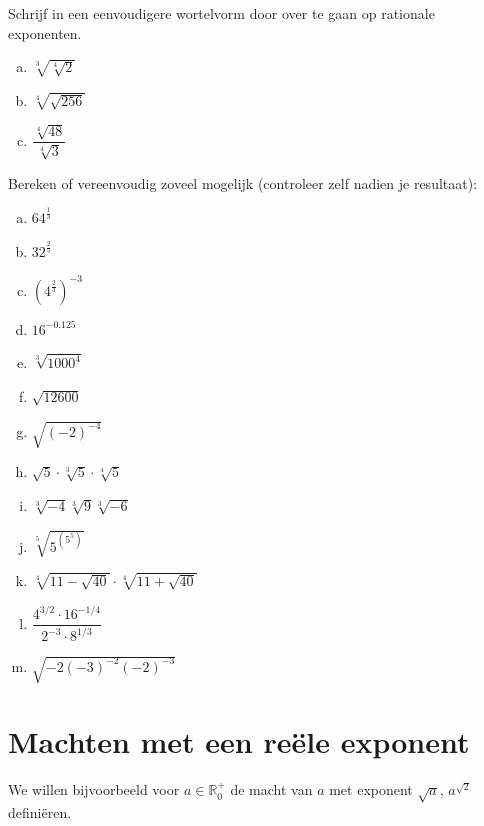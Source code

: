 \documentclass[12pt,twoside,a4paper]{article}
\begin{document}
\begin{oefening}
Schrijf in een eenvoudigere wortelvorm door over te gaan op rationale exponenten.
\begin{multicols}{2}
\begin{enumerate}[(a)]
  \itemsep1em
  \item $\sqrt[3]{\sqrt[4]{2}}$
  \item $\sqrt[4]{\sqrt{256}}$
  \item $\dfrac{\sqrt[4]{48}}{\sqrt[4]{3}}$
\end{enumerate}
\end{multicols}
\end{oefening}

\begin{oefening}
Bereken of vereenvoudig zoveel mogelijk (controleer zelf nadien je resultaat):
\begin{multicols}{3}
\begin{enumerate}[(a)]
  \itemsep1em
  \item $64^{\frac{1}{3}}$
  \item $32^{\frac{2}{5}}$
  \item $\left(4^{\frac{2}{3}}\right)^{-3}$
  \item $16^{-0.125}$
  \item $\sqrt[3]{1000^4}$
  \item $\sqrt{12600}$
  \item $\sqrt{\left(-2\right)^{-4}}$
  \item $\sqrt{5}\cdot\sqrt[3]{5}\cdot\sqrt[4]{5}$
  \item $\sqrt[3]{-4}\sqrt[3]{9}\sqrt[3]{-6}$
  \item $\sqrt[5]{5^{(5^5)}}$
  \item $\sqrt[4]{11-\sqrt{40}}\cdot\sqrt[4]{11+\sqrt{40}}$
  \item $\dfrac{4^{3/2}\cdot 16^{-1/4}}{2^{-3}\cdot 8^{1/3}}$
  \item $\sqrt{-2(-3)^{-2}(-2)^{-3}}$
\end{enumerate}
\end{multicols}
\end{oefening}

\cleardoublepage
\section{Machten met een reële exponent}

We willen bijvoorbeeld voor $a\in\mathbb{R}_0^+$ de macht van $a$ met exponent $\sqrt{a}$, $a^{\sqrt{2}}$ definiëren.
\end{document}

